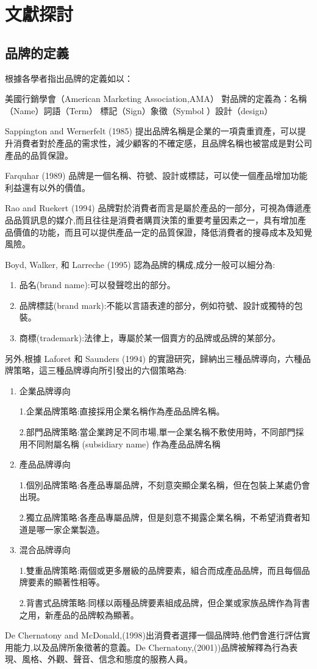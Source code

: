 \chapter{文獻探討}


\section{品牌的定義}

根據各學者指出品牌的定義如以：

美國行銷學會（American Marketing Association,AMA）
對品牌的定義為：名稱 （Name）詞語（Term） 標記（Sign）象徵（Symbol ）設計（design）\cite{AMA}

Sappington and Wernerfelt (1985) \cite{Sappington}提出品牌名稱是企業的一項貴重資產，可以提升消費者對於產品的需求性，減少顧客的不確定感，且品牌名稱也被當成是對公司產品的品質保證。

Farquhar (1989) \cite{Farquhar}品牌是一個名稱、符號、設計或標誌，可以使一個產品增加功能利益還有以外的價值。



Rao and Ruekert (1994) \cite{Rao}品牌對於消費者而言是屬於產品的一部分，可視為傳遞產品品質訊息的媒介,而且往往是消費者購買決策的重要考量因素之一，具有增加產品價值的功能，而且可以提供產品一定的品質保證，降低消費者的搜尋成本及知覺風險。

Boyd, Walker, 和 Larreche (1995)\cite{Boyd} 認為品牌的構成,成分一般可以細分為:
\begin{enumerate}
\item 品名(brand name):可以發聲唸出的部分。
\item 品牌標誌(brand mark):不能以言語表達的部分，例如符號、設計或獨特的包裝。 
\item 商標(trademark):法律上，專屬於某一個賣方的品牌或品牌的某部分。
\end{enumerate}

另外,根據 Laforet 和 Saunders (1994)\cite{Laforet} 的實證研究，歸納出三種品牌導向，六種品牌策略，這三種品牌導向所引發出的六個策略為:
\begin{enumerate}
\item 企業品牌導向

1.企業品牌策略:直接採用企業名稱作為產品品牌名稱。 

2.部門品牌策略:當企業跨足不同市場,單一企業名稱不敷使用時，不同部門採用不同附屬名稱 (subsidiary name) 作為產品品牌名稱
\item 產品品牌導向

1.個別品牌策略:各產品專屬品牌，不刻意突顯企業名稱，但在包裝上某處仍會出現。

2.獨立品牌策略:各產品專屬品牌，但是刻意不揭露企業名稱，不希望消費者知道是哪一家企業製造。
\item 混合品牌導向

1.雙重品牌策略:兩個或更多層級的品牌要素，組合而成產品品牌，而且每個品牌要素的顯著性相等。

2.背書式品牌策略:同樣以兩種品牌要素組成品牌，但企業或家族品牌作為背書之用，新產品的品牌較為顯著。
\end{enumerate}
De Chernatony and McDonald,(1998)\cite{Chernatony1998}出消費者選擇一個品牌時,他們會進行評估實用能力,以及品牌所象徵著的意義。De Chernatony,(2001))\cite{Chernatony2001}品牌被解釋為行為表現、風格、外觀、聲音、信念和態度的服務人員。

